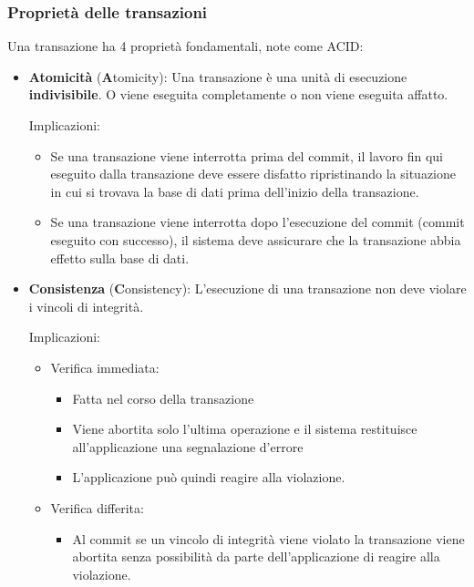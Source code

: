 \documentclass[a4paper]{article}
\begin{document}
\subsubsection{Proprietà delle transazioni}
Una transazione ha 4 proprietà fondamentali, note come ACID:
\begin{itemize}
  \item \textbf{Atomicità} (\textbf{A}tomicity):
    Una transazione è una unità di esecuzione \textbf{indivisibile}. O viene eseguita
    completamente o non viene eseguita affatto.

    \vspace{1em}
    \noindent
    Implicazioni:
    \begin{itemize}
      \item Se una transazione viene interrotta prima del commit, il lavoro fin qui
        eseguito dalla transazione deve essere disfatto ripristinando la situazione in
        cui si trovava la base di dati prima dell’inizio della transazione.

      \item Se una transazione viene interrotta dopo l’esecuzione del commit (commit
        eseguito con successo), il sistema deve assicurare che la transazione abbia
        effetto sulla base di dati.
    \end{itemize}

  \item \textbf{Consistenza} (\textbf{C}onsistency):
    L’esecuzione di una transazione non deve violare i vincoli di integrità.

    \vspace{1em}
    \noindent
    Implicazioni:
    \begin{itemize}
      \item Verifica immediata:
        \begin{itemize}
          \item Fatta nel corso della transazione
          \item Viene abortita solo l’ultima operazione e il sistema restituisce
            all’applicazione una segnalazione d’errore
          \item L’applicazione può quindi reagire alla violazione.
        \end{itemize}

      \item Verifica differita:
        \begin{itemize}
          \item Al commit se un vincolo di integrità viene violato la transazione viene
            abortita senza possibilità da parte dell’applicazione di reagire alla
            violazione.
        \end{itemize}
    \end{itemize}


\end{itemize}
\end{document}
